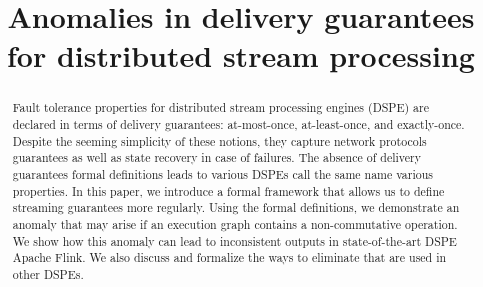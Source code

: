 \documentclass[sigconf]{acmart}
\theoremstyle{remark}
\begin{document}

    \title {Anomalies in delivery guarantees for distributed stream processing}








    \begin{abstract}
        Fault tolerance properties for distributed stream processing engines (DSPE) are declared in terms of delivery guarantees: at-most-once, at-least-once, and exactly-once.
        Despite the seeming simplicity of these notions, they capture network protocols guarantees as well as state recovery in case of failures.
        The absence of delivery guarantees formal definitions leads to various DSPEs call the same name various properties.
        In this paper, we introduce a formal framework that allows us to define streaming guarantees more regularly.
        Using the formal definitions, we demonstrate an anomaly that may arise if an execution graph contains a non-commutative operation.
        We show how this anomaly can lead to inconsistent outputs in state-of-the-art DSPE Apache Flink.
        We also discuss and formalize the ways to eliminate that are used in other DSPEs.
    \end{abstract}
\end{document}
